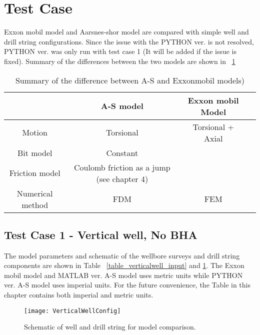 \section{Test Case}
Exxon mobil model and Aarsnes-shor model are compared with simple well and drill string configurations. Since the issue with the PYTHON ver. is not resolved, PYTHON ver. was only run with test case 1 (It will be added if the issue is fixed). Summary of the differences between the two models are shown in \tablename~\ref{table_model_difference}

\begin{table}[!hbt]
\centering
\begin{tabular}{|c|c|c|c|}
\hline & A-S model & Exxon mobil Model\\
\hline
Motion & Torsional & Torsional + Axial\\                                                              
\hline
Bit model & Constant &  \\                                                  
\hline
Friction model & Coulomb friction as a jump (see chapter 4) &  \\                                                  
\hline
Numerical method & FDM & FEM\\      
\hline                                                 
\end{tabular}
\caption[Summary of the difference between two models]{Summary of the difference between A-S and Exxonmobil models)}\label{table_model_difference}

\end{table}



\subsection{Test Case 1 - Vertical well, No BHA}
The model parameters and schematic of the wellbore surveys and drill string components are shown in Table \tablename~\ref{table_verticalwell_input} and \ref{figure_verticalwell}. The Exxon mobil model and MATLAB ver. A-S model uses metric units while PYTHON ver. A-S model uses imperial units. For the future convenience, the Table in this chapter contains both imperial and metric units.

\begin{figure}[!hbt]
  \centering
  \texttt{[image: VerticalWellConfig]}
  \caption[Schematic of well and drill string for model comparison.]{Schematic of well and drill string for model comparison.}\label{figure_verticalwell}
\end{figure}

